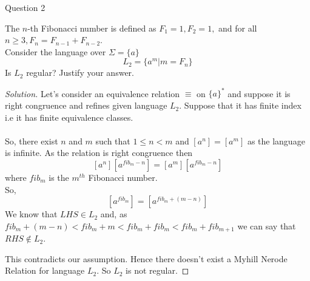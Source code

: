 \begin{solution}{Question 2}\label{ques:2}
    \begin{question}
    The $n$-th Fibonacci number is defined as $F_1 = 1, F_2 = 1,$ and for all $n\geq3,F_n = F_{n-1}+F_{n-2}$.\\
    Consider the language over $\Sigma = \{a\}$
    \begin{equation}
        L_2 = \{a^m | m = F_n\}
    \end{equation}
    Is $L_2$ regular? Justify your answer.
    \end{question}
    \tcblower{}
    \begin{proof}[Solution]
        Let's consider an equivalence relation $\equiv$ on $\{a\}^*$ and suppose it is right congruence and refines given language $L_2$. Suppose that it has finite index i.e it has finite equivalence classes. 
        \\
        \\
        So, there exist $n$ and $m$ such that $1 \leq n < m$  and $[a^n] = [a^m]$ as the language is infinite.
        As the relation is right congruence then 
        \[[a^n][a^{fib_m - n}] = [a^m][a^{fib_m - n}]\] where $fib_m$ is the $m^{th}$ Fibonacci number.\\
        So, 
        \[[a^{fib_m}] = [a^{fib_m +( m - n)}]\]
        We know that $LHS \in L_2$ and, as $fib_m + (m-n) < fib_m + m < fib_m + fib_m < fib_m + fib_{m+1}$ we can say that $RHS \notin L_2$.
        
        This contradicts our assumption. Hence there doesn't exist a Myhill Nerode Relation for language $L_2$. So $L_2$ is not regular.
        
        
    \end{proof}
\end{solution}
